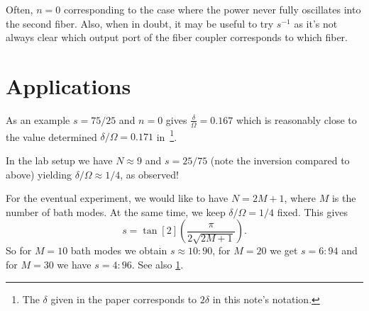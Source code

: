 \documentclass[fontsize=12pt,paper=usletter,open=any,
  twoside=no,toc=listof,toc=bibliography,
  captions=nooneline,captions=tableabove,english,DIV=calc,numbers=noenddot,final,parskip=full,
  headinclude=true,footinclude=false,BCOR=0mm,heading=normal]{scrartcl}
\begin{document}
Often, \(n=0\) corresponding to the case where the power never fully
oscillates into the second fiber. Also, when in doubt, it may be
useful to try \(s^{-1}\) as it's not always clear which output port of
the fiber coupler corresponds to which fiber.

\section{Applications}
\label{sec:applications}

As an example \(s=75/25\) and \(n=0\) gives \(\frac{δ}{Ω} = 0.167\)
which is reasonably close to the value determined \(δ/Ω = 0.171\)
in~\cite{Pellerin2023}\footnote{The \(δ\) given in the paper
  corresponds to \(2δ\) in this note's notation.}.

In the lab setup we have \(N\approx 9\) and \(s=25/75\) (note the inversion
compared to above) yielding \(δ/Ω \approx 1/4\), as observed!

For the eventual experiment, we would like to have \(N=2 M + 1\),
where \(M\) is the number of bath modes. At the same time, we keep
\(δ/Ω = 1/4\) fixed. This gives
\begin{equation}
  \label{eq:7}
  s = \tan[2](\frac{π}{2 \sqrt{2 M + 1}}).
\end{equation}
So for \(M=10\) bath modes we obtain \(s\approx10:90\), for \(M=20\) we get
\(s=6:94\) and for \(M=30\) we have \(s=4:96\). See also \cref{fig:splitting_ratio}.

\begin{figure}[H]
  \centering
  \label{fig:splitting_ratio}
\end{figure}

\printbibliography
\printindex
\end{document}
